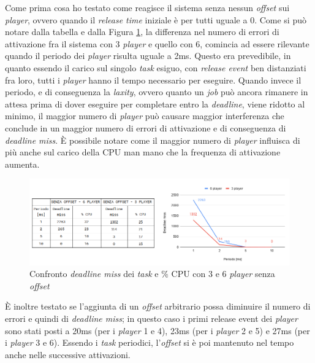 \documentclass{article}
\begin{document}
Come prima cosa ho testato come reagisce il sistema senza nessun \textit{offset} sui \textit{player}, ovvero quando il \textit{release time} iniziale è per tutti uguale a 0. Come si può notare dalla tabella e dalla Figura \ref{noC-noO}, la differenza nel numero di errori di attivazione fra il sistema con 3 \textit{player} e quello con 6, comincia ad essere rilevante quando il periodo dei \textit{player} risulta uguale a 2ms. Questo era prevedibile, in quanto essendo il carico sul singolo \textit{task} esiguo, con \textit{release event} ben distanziati fra loro, tutti i \textit{player} hanno il tempo necessario per eseguire. Quando invece il periodo, e di conseguenza la \textit{laxity}, ovvero quanto un \textit{job} può ancora rimanere in attesa prima di dover eseguire per completare entro la \textit{deadline}, viene ridotto al minimo, il maggior numero di \textit{player} può causare maggior interferenza che conclude in un maggior numero di errori di attivazione e di conseguenza di \textit{deadline miss}. È possibile notare come il maggior numero di \textit{player} influisca di più anche sul carico della CPU man mano che la frequenza di attivazione aumenta.
\begin{figure}[H]
	\centering
	\includegraphics[width=6in]{image/NO_CARICO-AUTOSTART.png}
	\caption{Confronto \textit{deadline miss} dei \textit{task} e \% CPU con 3 e 6 \textit{player} senza \textit{offset}}
	\label{noC-noO}
\end{figure}
È inoltre testato se l'aggiunta di un \textit{offset} arbitrario possa diminuire il numero di errori e quindi di \textit{deadline miss}; in questo caso i primi release event dei \textit{player} sono stati posti a 20ms (per i \textit{player} 1 e 4), 23ms (per i \textit{player} 2 e 5) e 27ms (per i \textit{player} 3 e 6). Essendo i \textit{task} periodici, l'\textit{offset} si è poi mantenuto nel tempo anche nelle successive attivazioni.
\end{document}
